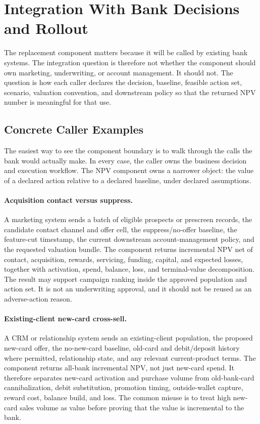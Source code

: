 \documentclass[11pt]{article}
\newcommand{\1}{\mathbf{1}}
\begin{document}
\section{Integration With Bank Decisions and Rollout}
\label{sec:v3-integration-rollout}

The replacement component matters because it will be called by existing bank
systems.  The integration question is therefore not whether the component should
own marketing, underwriting, or account management.  It should not.  The
question is how each caller declares the decision, baseline, feasible action set,
scenario, valuation convention, and downstream policy so that the returned NPV
number is meaningful for that use.

\subsection{Concrete Caller Examples}
\label{subsec:concrete-caller-examples}

The easiest way to see the component boundary is to walk through the calls the
bank would actually make. In every case, the caller owns the business decision
and execution workflow. The NPV component owns a narrower object: the value of a
declared action relative to a declared baseline, under declared assumptions.

\paragraph{Acquisition contact versus suppress.}
A marketing system sends a batch of eligible prospects or prescreen records,
the candidate contact channel and offer cell, the suppress/no-offer baseline,
the feature-cut timestamp, the current downstream account-management policy,
and the requested valuation bundle. The component returns incremental NPV net
of contact, acquisition, rewards, servicing, funding, capital, and expected
losses, together with activation, spend, balance, loss, and terminal-value
decomposition. The result may support campaign ranking inside the approved
population and action set. It is not an underwriting approval, and it should not
be reused as an adverse-action reason.

\paragraph{Existing-client new-card cross-sell.}
A CRM or relationship system sends an existing-client population, the proposed
new-card offer, the no-new-card baseline, old-card and debit/deposit history
where permitted, relationship state, and any relevant current-product terms.
The component returns all-bank incremental NPV, not just new-card spend. It
therefore separates new-card activation and purchase volume from old-bank-card
cannibalization, debit substitution, promotion timing, outside-wallet capture,
reward cost, balance build, and loss. The common misuse is to treat high
new-card sales volume as value before proving that the value is incremental to
the bank.
\end{document}
